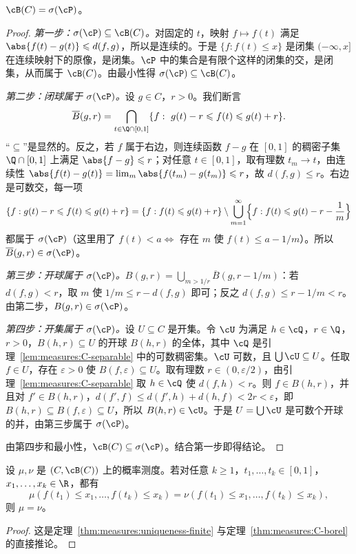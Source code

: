 \begin{theorem}\label{thm:measures:C-borel}
$\cB(C)=\sigma(\cP)$。
\end{theorem}
\begin{proof}
\emph{第一步：$\sigma(\cP)\subseteq\cB(C)$。}对固定的 $t$，映射 $f\mapsto f(t)$ 满足 $\abs{f(t)-g(t)}\leqslant d(f,g)$，所以是连续的。于是 $\{f:f(t)\leqslant x\}$ 是闭集 $(-\infty,x]$ 在连续映射下的原像，是闭集。$\cP$ 中的集合是有限个这样的闭集的交，是闭集，从而属于 $\cB(C)$。由最小性得 $\sigma(\cP)\subseteq\cB(C)$。

\emph{第二步：闭球属于 $\sigma(\cP)$。}设 $g\in C$，$r>0$。我们断言
\[
\overline B(g,r)=\bigcap_{t\in\Q\cap[0,1]}\{f:\ g(t)-r\leqslant f(t)\leqslant g(t)+r\}.
\]
“$\subseteq$”是显然的。反之，若 $f$ 属于右边，则连续函数 $f-g$ 在 $[0,1]$ 的稠密子集 $\Q\cap[0,1]$ 上满足 $\abs{f-g}\leqslant r$；对任意 $t\in[0,1]$，取有理数 $t_m\to t$，由连续性 $\abs{f(t)-g(t)}=\lim_m\abs{f(t_m)-g(t_m)}\leqslant r$，故 $d(f,g)\leqslant r$。右边是可数交，每一项
\[
\{f: g(t)-r\leqslant f(t)\leqslant g(t)+r\}=\{f: f(t)\leqslant g(t)+r\}\setminus\bigcup_{m=1}^\infty\Bigl\{f: f(t)\leqslant g(t)-r-\frac1m\Bigr\}
\]
都属于 $\sigma(\cP)$（这里用了 $f(t)<a\iff$ 存在 $m$ 使 $f(t)\leqslant a-1/m$）。所以 $\overline B(g,r)\in\sigma(\cP)$。

\emph{第三步：开球属于 $\sigma(\cP)$。}$B(g,r)=\bigcup_{m>1/r}\overline B(g,r-1/m)$：若 $d(f,g)<r$，取 $m$ 使 $1/m\leqslant r-d(f,g)$ 即可；反之 $d(f,g)\leqslant r-1/m<r$。由第二步，$B(g,r)\in\sigma(\cP)$。

\emph{第四步：开集属于 $\sigma(\cP)$。}设 $U\subseteq C$ 是开集。令 $\cU$ 为满足 $h\in\cQ$，$r\in\Q$，$r>0$，$B(h,r)\subseteq U$ 的开球 $B(h,r)$ 的全体，其中 $\cQ$ 是引理~\ref{lem:measures:C-separable} 中的可数稠密集。$\cU$ 可数，且 $\bigcup\cU\subseteq U$。任取 $f\in U$，存在 $\varepsilon>0$ 使 $B(f,\varepsilon)\subseteq U$。取有理数 $r\in(0,\varepsilon/2)$，由引理~\ref{lem:measures:C-separable} 取 $h\in\cQ$ 使 $d(f,h)<r$。则 $f\in B(h,r)$，并且对 $f'\in B(h,r)$，$d(f',f)\leqslant d(f',h)+d(h,f)<2r<\varepsilon$，即 $B(h,r)\subseteq B(f,\varepsilon)\subseteq U$，所以 $B(h,r)\in\cU$。于是 $U=\bigcup\cU$ 是可数个开球的并，由第三步属于 $\sigma(\cP)$。

由第四步和最小性，$\cB(C)\subseteq\sigma(\cP)$。结合第一步即得结论。
\end{proof}

\begin{corollary}\label{cor:measures:C-uniqueness}
设 $\mu,\nu$ 是 $(C,\cB(C))$ 上的概率测度。若对任意 $k\geqslant1$，$t_1,\dots,t_k\in[0,1]$，$x_1,\dots,x_k\in\R$，都有
\[
\mu(f(t_1)\leqslant x_1,\dots,f(t_k)\leqslant x_k)=\nu(f(t_1)\leqslant x_1,\dots,f(t_k)\leqslant x_k),
\]
则 $\mu=\nu$。
\end{corollary}
\begin{proof}
这是定理~\ref{thm:measures:uniqueness-finite} 与定理~\ref{thm:measures:C-borel} 的直接推论。
\end{proof}

